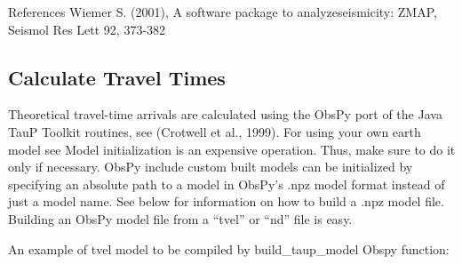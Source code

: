 \documentclass[a4paper,12pt,english]{sphinxmanual}
\begin{document}
References
Wiemer S. (2001), A software package to analyzeseismicity: ZMAP, Seismol Res Lett 92, 373-382


\subsection{Calculate Travel Times}
\label{\detokenize{sub/input.calculate_ttimes:calculate-travel-times}}\label{\detokenize{sub/input.calculate_ttimes::doc}}
Theoretical travel-time arrivals are calculated using the ObsPy port of the Java TauP Toolkit routines, see  (Crotwell et al., 1999).
For using your own earth model see 
Model initialization is an expensive operation. Thus, make sure to do it only if necessary.
ObsPy include custom built models can be initialized by specifying an absolute path to a model in ObsPy’s .npz model format instead of just a model name. See below for information on how to build a .npz model file.
Building an ObsPy model file from a “tvel” or “nd” file is easy.

An example of tvel model to be compiled by build\_taup\_model Obspy function:

\begin{sphinxVerbatim}[commandchars=\\\{\}]
  
       
                        
                       
                       
                       
                       
                      
                      
                      
\end{sphinxVerbatim}
\end{document}
